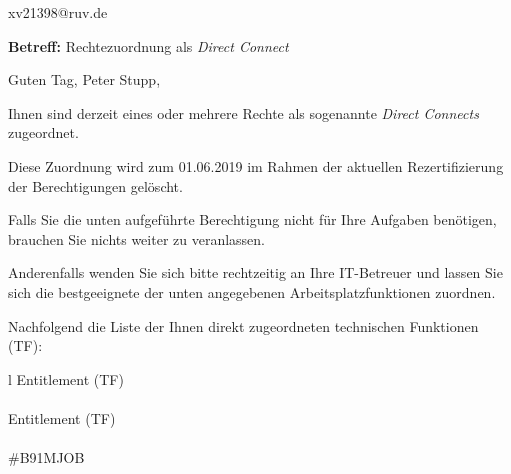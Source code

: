 \documentclass[a4paper,landscape,12pt]{letter}
\begin{document}
\begin{letter}{xv21398@ruv.de\hfill \break}
\begin{normalsize}
	\opening{\textbf{Betreff:} Rechtezuordnung als \emph{Direct Connect}}
	\begin{normalsize} \hfill
	\end{normalsize}

	\begin{normalsize}
		Guten Tag, 
	Peter Stupp, \hfill \break
	\end{normalsize}
	\end{normalsize}
	
\begin{normalsize}
	Ihnen sind derzeit eines oder mehrere Rechte als sogenannte \emph{Direct Connects} zugeordnet.
	
	Diese Zuordnung wird zum 01.06.2019 im Rahmen der aktuellen Rezertifizierung der Berechtigungen gelöscht.
	
	Falls Sie die unten aufgeführte Berechtigung nicht für Ihre Aufgaben benötigen, 
	brauchen Sie nichts weiter zu veranlassen.
	
	Anderenfalls wenden Sie sich bitte rechtzeitig an Ihre IT-Betreuer 
	und lassen Sie sich die bestgeeignete der unten angegebenen Arbeitsplatzfunktionen zuordnen.
	\end{normalsize}
	
\begin{normalsize}
	Nachfolgend die Liste der Ihnen direkt zugeordneten technischen Funktionen (TF):

	\begin{longtable}{l}
		Entitlement (TF) \\ \hline
		\endfirsthead
		\\\hline
		Entitlement (TF) \\ \hline
		\endhead %
		\multicolumn{1}{r@{}}{Fortsetzung \ldots}\\
		\endfoot
		\hline
		\endlastfoot
	\#B91MJOB\\
	\end{longtable}
	\end{normalsize}
	

\end{letter}
\end{document}
